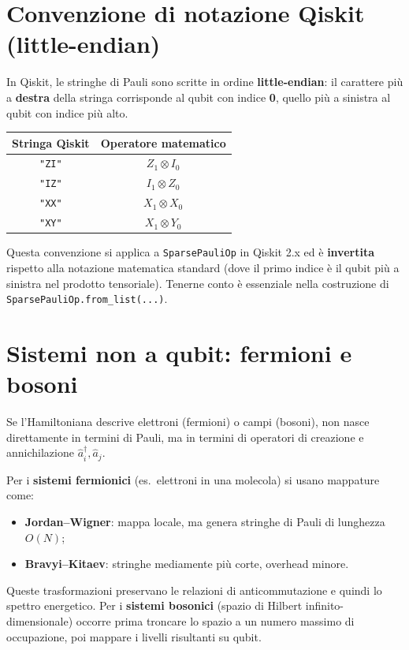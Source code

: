 \documentclass[11pt,a4paper]{article}
\begin{document}
\section{Convenzione di notazione Qiskit (little-endian)}

In Qiskit, le stringhe di Pauli sono scritte in ordine
\textbf{little-endian}: il carattere più a \textbf{destra} della
stringa corrisponde al qubit con indice \textbf{0}, quello più a
sinistra al qubit con indice più alto.

\begin{center}
\renewcommand{\arraystretch}{1.25}
\begin{tabular}{@{}cc@{}}
\toprule
\rowcolor{inkblue!10}
\textbf{Stringa Qiskit} & \textbf{Operatore matematico}\\
\midrule
\texttt{"ZI"} & $Z_1\otimes I_0$\\
\texttt{"IZ"} & $I_1\otimes Z_0$\\
\texttt{"XX"} & $X_1\otimes X_0$\\
\texttt{"XY"} & $X_1\otimes Y_0$\\
\bottomrule
\end{tabular}
\end{center}

Questa convenzione si applica a \texttt{SparsePauliOp} in Qiskit 2.x ed
è \textbf{invertita} rispetto alla notazione matematica standard (dove
il primo indice è il qubit più a sinistra nel prodotto tensoriale).
Tenerne conto è essenziale nella costruzione di
\texttt{SparsePauliOp.from\_list(...)}.

\section{Sistemi non a qubit: fermioni e bosoni}

Se l'Hamiltoniana descrive elettroni (fermioni) o campi (bosoni), non
nasce direttamente in termini di Pauli, ma in termini di operatori di
creazione e annichilazione $\hat a_i^\dagger,\hat a_j$.

Per i \textbf{sistemi fermionici} (es.\ elettroni in una molecola) si
usano mappature come:
\begin{itemize}[leftmargin=1.3em,itemsep=0.1em]
\item \textbf{Jordan--Wigner}: mappa locale, ma genera stringhe di Pauli
di lunghezza $O(N)$;
\item \textbf{Bravyi--Kitaev}: stringhe mediamente più corte, overhead
minore.
\end{itemize}
Queste trasformazioni preservano le relazioni di anticommutazione e
quindi lo spettro energetico. Per i \textbf{sistemi bosonici} (spazio
di Hilbert infinito-dimensionale) occorre prima troncare lo spazio a un
numero massimo di occupazione, poi mappare i livelli risultanti su
qubit.
\end{document}

